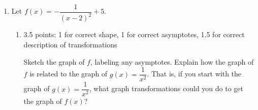 \documentclass{article}
\providecommand{\check}{}
\renewcommand{\check}{\ifmmode{\text{ \ding{51} }}\else{\ding{51} }\fi}
\begin{document}
\begin{enumerate}
\begin{enumerate}
\begin{problem}[\vfill\newpage]
      \check Make sure your formula for $f^{-1}$ is consistent with your graph!
    \end{problem}

    \begin{solution}
      
      To find the formula for $f^{-1}(x)$ algebraically, we start with
      $y = f(x)$, switch $x$ and $y$, and then solve for $y$. 
      \begin{enumerate}
      \item
        \begin{align*}
          x &= 2y + 1 \\
          x - 1 &= 2y \\
          y &= \frac{x - 1}{2} \\
          f^{-1}(x) &= \boxed{\frac{x - 1}{2}}
        \end{align*}
      \item 
        \begin{align*}
          (y-1)^2 -2 &= x \\
          (y-1)^2 &= x+2 \\
          y-1 &= \sqrt{x+2} \\
          y &= \sqrt{x+2} + 1 \\
          f^{-1}(x) &= \boxed{\sqrt{x+2} + 1}
        \end{align*}
      \end{enumerate}
    \end{solution}

  \end{enumerate}

\item 

  Let $f(x) = -\dfrac{1}{(x - 2)^2} + 5$.

  \begin{enumerate}
  \item

    \begin{grading}
      3.5 points: 1 for correct shape, 1 for correct asymptotes, 1.5 for correct description of transformations 
    \end{grading}

    \begin{problem}[\vfill]
      Sketch the graph of $f$, labeling any asymptotes. Explain how the graph of $f$ is related to the graph of $g(x) = \dfrac{1}{x^2}$. That is, if you start with the graph of $g(x) = \dfrac{1}{x^2}$, what graph transformations could you do to get the graph of $f(x)$?
    \end{problem}


\end{enumerate}
\end{enumerate}
\end{document}
